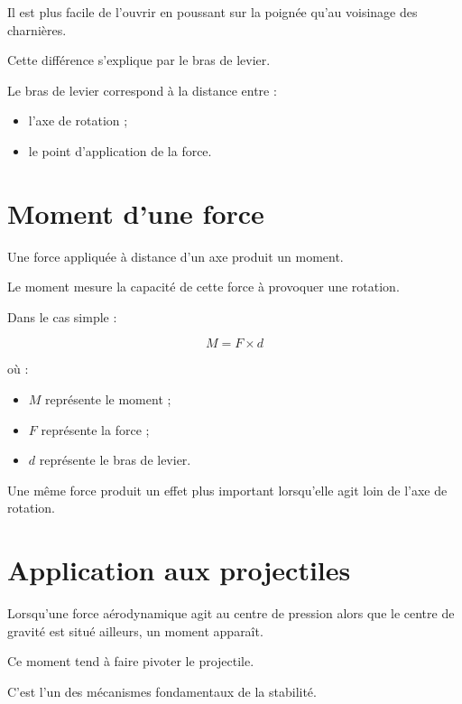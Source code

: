 Il est plus facile de l'ouvrir en poussant sur la poignée qu'au voisinage des
charnières.

Cette différence s'explique par le bras de levier.

Le bras de levier correspond à la distance entre :

\begin{itemize}
    \item l'axe de rotation ;
    \item le point d'application de la force.
\end{itemize}

\section{Moment d'une force}

Une force appliquée à distance d'un axe produit un moment.

Le moment mesure la capacité de cette force à provoquer une rotation.

Dans le cas simple :

\begin{equation}
M = F \times d
\end{equation}

où :

\begin{itemize}
    \item $M$ représente le moment ;
    \item $F$ représente la force ;
    \item $d$ représente le bras de levier.
\end{itemize}

\begin{aretenir}

Une même force produit un effet plus important lorsqu'elle agit loin de
l'axe de rotation.

\end{aretenir}

\section{Application aux projectiles}

Lorsqu'une force aérodynamique agit au centre de pression alors que le centre
de gravité est situé ailleurs, un moment apparaît.

Ce moment tend à faire pivoter le projectile.

C'est l'un des mécanismes fondamentaux de la stabilité.

